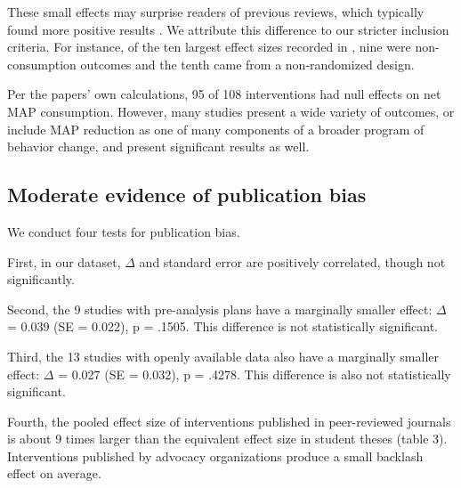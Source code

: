 \documentclass[sn-nature,pdflatex]{sn-jnl}
\begin{document}
These small effects may surprise readers of previous reviews, which
typically found more positive results
\citep{mathur2021meta, meier2022, mertens2022}. We attribute this
difference to our stricter inclusion criteria. For instance, of the ten
largest effect sizes recorded in \citep{mathur2021effectiveness}, nine
were non-consumption outcomes and the tenth came from a non-randomized
design.

Per the papers' own calculations, 95 of 108 interventions had null
effects on net MAP consumption. However, many studies present a wide
variety of outcomes, or include MAP reduction as one of many components
of a broader program of behavior change, and present significant results
as well.

\begin{comment}
Using our calculations of effect size and standard error 13 interventions have 95%
\end{comment}

\subsection{Moderate evidence of publication bias}\label{sec2.2}

We conduct four tests for publication bias.

\begin{comment} 
introductory remarks about how this puts our main results in one light or another? 
\end{comment}

First, in our dataset, \(\Delta\) and standard error are positively
correlated, though not significantly.

Second, the 9 studies with pre-analysis plans have a marginally smaller
effect: \(\Delta\) = 0.039 (SE = 0.022), p = .1505. This difference is
not statistically significant.

Third, the 13 studies with openly available data also have a marginally
smaller effect: \(\Delta\) = 0.027 (SE = 0.032), p = .4278. This
difference is also not statistically significant.

Fourth, the pooled effect size of interventions published in
peer-reviewed journals is about 9 times larger than the equivalent
effect size in student theses (table 3). Interventions published by
advocacy organizations produce a small backlash effect on average.
\end{document}
